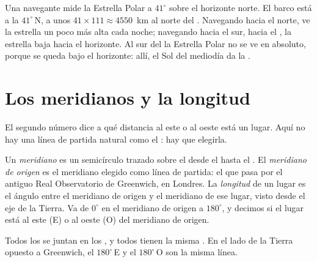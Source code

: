 \begin{example}\label{ex:g6:latitude-longitude:pole-star}
Una navegante mide la Estrella Polar a $41^\circ$ sobre el horizonte norte.
El barco está a la  $41^\circ$\,N, a unos $41 \times 111
\approx \num{4550}$~km al norte del . Navegando hacia el norte, ve la
estrella un poco más alta cada noche; navegando hacia el sur, hacia el
, la estrella baja hacia el horizonte. Al sur del  la
Estrella Polar no se ve en absoluto, porque se queda bajo el horizonte:
allí, el Sol del mediodía da la .
\end{example}

\section{Los meridianos y la longitud}

El segundo número dice a qué distancia al este o al oeste está un lugar.
Aquí no hay una línea de partida natural como el : hay que elegirla.

\begin{definition}\label{def:g6:latitude-longitude:longitude}
Un \emph{meridiano} es un semicírculo trazado sobre el
 desde el  hasta el . El \emph{meridiano de
origen} es el meridiano elegido como línea de
partida: el que pasa por el antiguo Real Observatorio de Greenwich, en
Londres. La \emph{longitud} de un lugar es el ángulo entre
el meridiano de origen y el meridiano de ese lugar, visto desde el eje de
la Tierra. Va de $0^\circ$ en el meridiano de origen a $180^\circ$, y
decimos si el lugar está al este (E) o al oeste (O) del meridiano de
origen.
\end{definition}

Todos los  se juntan en los , y todos tienen la misma
. En el lado de la Tierra opuesto a Greenwich, el 
$180^\circ$\,E y el  $180^\circ$\,O son la misma línea.

